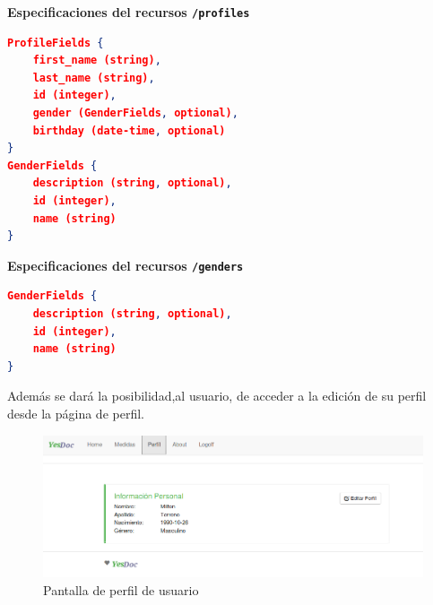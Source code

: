 	\textbf{Especificaciones del recursos \texttt{/profiles}}
    
        \begin{lstlisting}[language=json,firstnumber=1]
ProfileFields {
	first_name (string),
	last_name (string),
	id (integer),
	gender (GenderFields, optional),
	birthday (date-time, optional)
}
GenderFields {
	description (string, optional),
	id (integer),
	name (string)
} 
        \end{lstlisting}

	\textbf{Especificaciones del recursos \texttt{/genders}}
        \begin{lstlisting}[language=json,firstnumber=1]
GenderFields {
	description (string, optional),
	id (integer),
	name (string)
} 
        \end{lstlisting}

Además se dará la posibilidad,al usuario, de acceder a la edición de su perfil desde la página de perfil. 


    \begin{figure}[h]
        \centering
        \includegraphics[width=1\textwidth]{img/tp1_parte2/1-perfil}
        \caption{Pantalla de perfil de usuario}
		\label{perfil}
    \end{figure}

